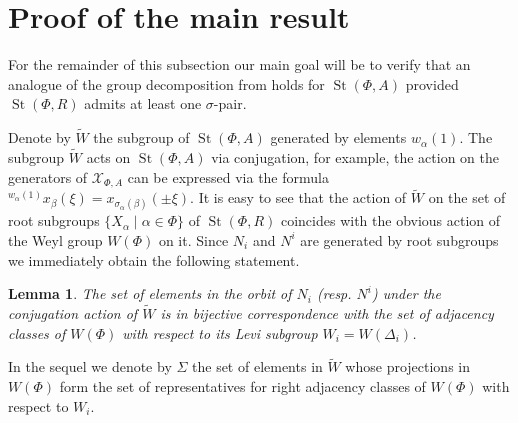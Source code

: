 \documentclass[oneside, 10pt]{amsart}
\DeclareMathOperator{\St}{St}
\newcommand{\UU}{\hat{\mathrm{U}}}      %
\newcommand{\StH}{\hat{\mathrm{H}}}     %
\newcommand{\ext}[1]{\mu_{#1}}           %
\numberwithin{equation}{section}
\newtheorem{lemma}{Lemma}
\numberwithin{lemma}{section}
\theoremstyle{definition}
\theoremstyle{remark}
\begin{document}
\begin{comment}                                
Denote by $V_0$ the set $\St(\Phi, A[t]) \times \StH(A[t, t^{-1}]) \times \St(\Phi, A[t, t^{-1}], m[t, t^{-1}])$. 
We define an equivalence relation $\sim$ on $V_0$ as the minimal equivalence relation generated by the following 4 elementary transformations:
\begin{enumerate}
 \item $(a \cdot u, b, \beta) \sim (a, j_+^*(u) \cdot b, \beta)$, where $u$ is an element $\UU(\Phi^+, A[t])$;
 \item $(a \cdot \ext{m[t]}(\gamma), b, \beta) \sim (a, b, j^*_+(\gamma)^b \cdot \beta)$, where $\gamma$ is an element of $\St(\Phi, A[t], m[t])$;
 \item $(a, b \cdot u, \beta) \sim (a, b, u\cdot \beta)$, where $u$ is an element of $\UU(\Phi^+, m[t, t^{-1}])$;
 \item $(a, b \cdot \{ t, a \}_\alpha, \beta) \sim (a, b, \{ t, a \}'_\alpha \cdot \beta) $, where $a \in (1+m)^*$
  and $\{t, a\}'_\alpha$ is a relative Steinberg symbol discussed in~\cref{sec:relative-steinberg}
\end{enumerate}
\end{comment}


\section{Proof of the main result}
For the remainder of this subsection our main goal will be to verify that an analogue of the group decomposition from \cite[Lemma~3.1f]{Tu83} holds for $\St(\Phi, A)$
 provided $\St(\Phi, R)$ admits at least one $\sigma$-pair.

Denote by $\widetilde{W}$ the subgroup of $\St(\Phi, A)$ generated by elements $w_\alpha(1)$.
The subgroup $\widetilde{W}$ acts on $\St(\Phi, A)$ via conjugation, for example, 
 the action on the generators of $\mathcal{X}_{\Phi, A}$ can be expressed via the formula ${}^{w_\alpha(1)} \!x_{\beta}(\xi) = x_{\sigma_{\alpha}(\beta)} ( \pm \xi)$.
It is easy to see that the action of $\widetilde{W}$ on the set of root subgroups $\{X_\alpha \mid \alpha \in \Phi \}$ of $\St(\Phi, R)$ coincides with the obvious
 action of the Weyl group $W(\Phi)$ on it. Since $N_i$ and $N^i$ are generated by root subgroups we immediately obtain the following statement.
\begin{lemma} The set of elements in the orbit of $N_i$ (resp. $N^i$) under the conjugation action of $\widetilde{W}$ 
is in bijective correspondence with 
the set of adjacency classes of $W(\Phi)$ with respect to its Levi subgroup $W_i = W(\Delta_i)$. %
\end{lemma}
In the sequel we denote by $\Sigma$ the set of elements in $\widetilde{W}$ whose projections in $W(\Phi)$ form the set of representatives for
 right adjacency classes of $W(\Phi)$ with respect to $W_i$. %
\end{document}

